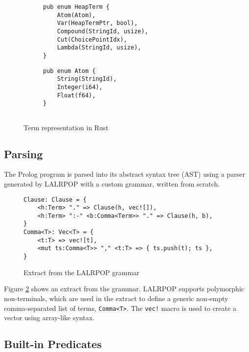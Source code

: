 \begin{figure}[H]
\centering
\begin{subfigure}{0.5\textwidth}
\centering
\begin{verbatim}
pub enum HeapTerm {
    Atom(Atom),
    Var(HeapTermPtr, bool),
    Compound(StringId, usize),
    Cut(ChoicePointIdx),
    Lambda(StringId, usize),
}
\end{verbatim}
\end{subfigure}%
\begin{subfigure}{0.5\textwidth}
\centering
\begin{verbatim}
pub enum Atom {
    String(StringId),
    Integer(i64),
    Float(f64),
}


\end{verbatim}
\end{subfigure}
\caption{Term representation in Rust}
\label{fig:rust-term-representation}
\end{figure}

\subsection{Parsing}

The Prolog program is parsed into its abstract syntax tree (AST) using a parser generated by LALRPOP \cite{thelalrpopprojectdevelopersLALRPOPhttpsgithubcom2015} with a custom grammar, written from scratch.

\begin{figure}[H]
\centering
\begin{verbatim}
Clause: Clause = {
    <h:Term> "." => Clause(h, vec![]),
    <h:Term> ":-" <b:Comma<Term>> "." => Clause(h, b),
}
Comma<T>: Vec<T> = {
    <t:T> => vec![t],
    <mut ts:Comma<T>> "," <t:T> => { ts.push(t); ts },
}
\end{verbatim}
\caption{Extract from the LALRPOP grammar}
\label{fig:grammar}
\end{figure}

Figure \ref{fig:grammar} shows an extract from the grammar. LALRPOP supports polymorphic non-terminals, which are used in the extract to define a generic non-empty comma-separated list of terms, \texttt{Comma<T>}. The \texttt{vec!} macro is used to create a vector using array-like syntax.

\subsection{Built-in Predicates}

